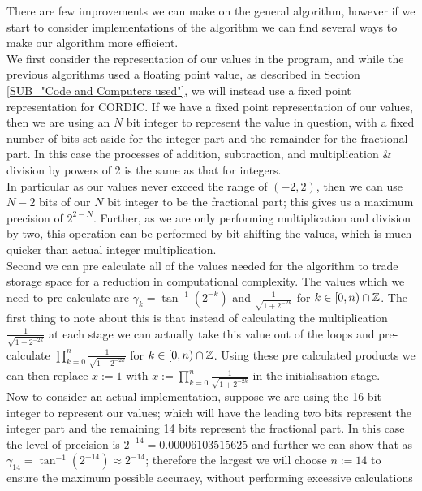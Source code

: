 {There are few improvements we can make on the general algorithm, however if we start to consider implementations of the algorithm we can find several ways to make our algorithm more efficient.\\

We first consider the representation of our values in the program, and while the previous algorithms used a floating point  value, as described in Section \ref{SUB_"Code and Computers used"}, we will instead  use a fixed point representation for CORDIC. If we have a fixed point representation of our values, then we are using an \(N\) bit integer to represent the value in question, with a fixed number of bits set aside for the integer part and the remainder for the fractional part. In this case the processes of addition, subtraction, and multiplication \& division by powers of 2 is the same as that for integers.\\

In particular as our values never exceed the range of \((-2,2)\), then we can use \(N-2\) bits of our \(N\) bit integer to be the fractional part; this gives us a maximum precision of \(2^{2-N}\). Further, as we are only performing multiplication and division by two, this operation can be performed by bit shifting the values, which is much quicker than actual integer multiplication.\\

Second we can pre calculate all of the values needed for the algorithm to trade storage space for a reduction in computational complexity. The values which we need to pre-calculate are \(\gamma_k = \tan^{-1}(2^{-k})\) and \(\tfrac{1}{\sqrt{1+2^{-2k}}}\) for \(k \in [0, n) \cap \mathbb{Z}\). The first thing to note about this is that instead of calculating the multiplication \(\tfrac{1}{\sqrt{1+2^{-2k}}}\) at each stage we can actually take this value out of the loops and pre-calculate \(\prod_{k=0}^n \tfrac{1}{\sqrt{1+2^{-2k}}}\) for \(k \in [0, n) \cap \mathbb{Z}\). Using these pre calculated products we can then replace \(x := 1\) with \(x := \prod_{k=0}^n \tfrac{1}{\sqrt{1+2^{-2k}}}\) in the initialisation stage.\\

Now to consider an actual implementation, suppose we are using the 16 bit integer  to represent our values; which will have the leading two bits represent the integer part and the remaining 14 bits represent the fractional part. In this case the level of precision is \(2^{-14} = 0.00006103515625\) and further we can show that as \(\gamma_{14} = \tan^{-1}(2^{-14}) \approx 2^{-14}\); therefore the largest we will choose \(n := 14\) to ensure the maximum possible accuracy, without performing excessive calculations\\

}
